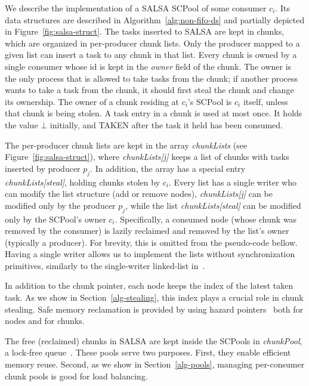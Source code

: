 We describe the implementation of a SALSA SCPool of some consumer $c_i$.
Its data structures are described in Algorithm~\ref{alg:non-fifo-ds} and partially depicted in Figure~\ref{fig:salsa-struct}. The tasks inserted to SALSA are kept in chunks, which are organized in per-producer chunk lists. Only the producer mapped to a given list can insert a task to any chunk in that list. Every chunk is owned by a single consumer whose id is kept in the \emph{owner} field of the chunk.
The owner is the only process that is allowed to take tasks from the chunk; if another process wants to take a task from the chunk, it should first steal the chunk and change its ownership. The owner of a chunk
residing at $c_i$'s SCPool is $c_i$ itself, unless that chunk is being stolen. A task entry in a chunk is used at most once. It holds the value $\bot$ initially, and TAKEN after the task it held has been consumed.

The per-producer chunk lists are kept in the array \emph{chunkLists} (see Figure~\ref{fig:salsa-struct}), where \emph{chunkLists[j]} keeps a list of chunks with tasks inserted by producer $p_j$. In addition, the array has a special entry \emph{chunkLists[steal]}, holding chunks stolen by $c_i$. Every list has a single writer who can modify the list structure (add or remove nodes), \emph{chunkLists[j]} can be modified only by the producer $p_j$, while the list \emph{chunkLists[steal]} can be modified only by the SCPool's owner $c_i$. Specifically, a consumed node (whose chunk was removed by the consumer) is lazily reclaimed and removed by the list's owner (typically a producer). For brevity, this is omitted from the pseudo-code bellow. Having a single writer allows us to implement the lists without synchronization primitives, similarly to the single-writer linked-list in~\cite{Michael:2004:HPS:987524.987595}.

In addition to the chunk pointer, each node keeps the index of the latest taken task. As we show in Section~\ref{alg-stealing}, this index plays a crucial role in chunk stealing. Safe memory reclamation is provided by using hazard pointers~\cite{Michael:2004:HPS:987524.987595} both for nodes and for chunks.

The free (reclaimed) chunks in SALSA are kept inside the SCPools in \emph{chunkPool}, a lock-free queue~\cite{Michael:1996:SFP:248052.248106}. These pools serve two purposes. First, they enable efficient memory reuse. Second, as we show in Section~\ref{alg-pools}, managing per-consumer chunk pools is good for load balancing. 